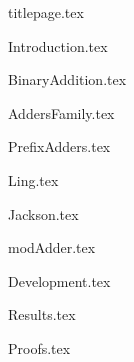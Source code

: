 \documentclass[a4paper,11pt]{article}
\begin{document}
{titlepage.tex}


\tableofcontents
\clearpage

\listoffigures
\listoftables
\clearpage



{Introduction.tex}
\clearpage



{BinaryAddition.tex}
\clearpage



{AddersFamily.tex}
\clearpage



{PrefixAdders.tex}
\clearpage



{Ling.tex}
\clearpage



{Jackson.tex}
\clearpage



{modAdder.tex}
\clearpage




{Development.tex}
\clearpage



{Results.tex}
\clearpage




{Proofs.tex}
\clearpage






\end{document}
